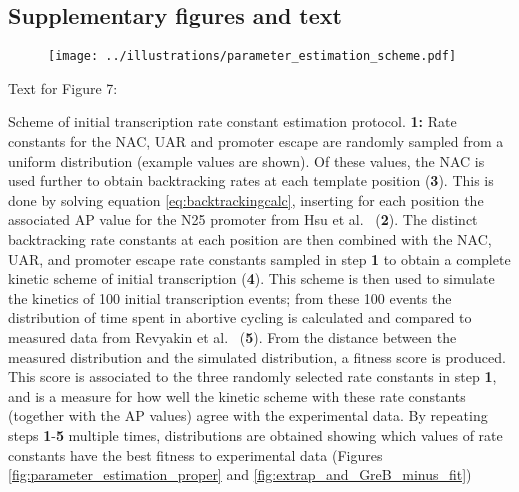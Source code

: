\subsection{Supplementary figures and text}

\begin{figure}
    \begin{center}
      \texttt{[image: ../illustrations/parameter\_estimation\_scheme.pdf]}
    \end{center}
    \caption{}
    \label{fig:parameter_estimation_scheme}
\end{figure}

Text for Figure 7:

Scheme of initial transcription rate constant estimation protocol. \textbf{1:}
Rate constants for the NAC, UAR and promoter escape are randomly sampled from
a uniform distribution (example values are shown). Of these values, the NAC is
used further to obtain backtracking rates at each template position
(\textbf{3}).  This is done by solving equation \eqref{eq:backtrackingcalc},
inserting for each position the associated AP value for the N25 promoter from
Hsu et al.\ \cite{hsu_initial_2006} (\textbf{2}). The distinct backtracking
rate constants at each position are then combined with the NAC, UAR, and
promoter escape rate constants sampled in step \textbf{1} to obtain a complete
kinetic scheme of initial transcription (\textbf{4}). This scheme is then used
to simulate the kinetics of 100 initial transcription events; from these 100
events the distribution of time spent in abortive cycling is calculated and
compared to measured data from Revyakin et al.\ \cite{revyakin_abortive_2006}
(\textbf{5}). From the distance between the measured distribution and the
simulated distribution, a fitness score is produced. This score is associated
to the three randomly selected rate constants in step \textbf{1}, and is a
measure for how well the kinetic scheme with these rate constants (together
with the AP values) agree with the experimental data. By repeating steps
\textbf{1}-\textbf{5} multiple times, distributions are obtained showing which
values of rate constants have the best fitness to experimental data (Figures
\ref{fig:parameter_estimation_proper} and \ref{fig:extrap_and_GreB_minus_fit}) 
